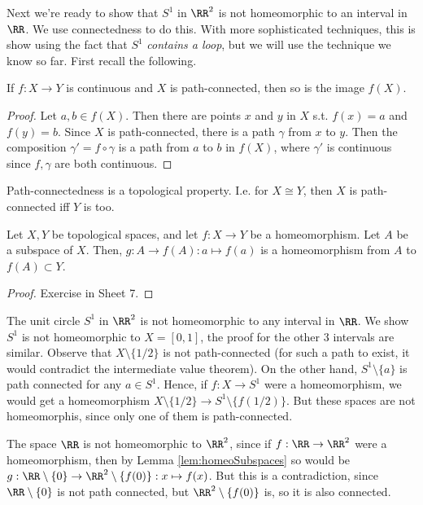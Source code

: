 Next we're ready to show that $S^{1}$ in $\RR^2$ is not homeomorphic to an
interval in $\RR$. We use connectedness to do this. With more sophisticated
techniques, this is show using the fact that $S^1$ \emph{contains a loop}, but
we will use the technique we know so far. First recall the following.
\begin{lemma}
  If $f:X\to Y$ is continuous and $X$ is path-connected, then so is the image
  $f(X)$. 
\end{lemma}
\begin{proof}
  Let $a,b\in f(X)$. Then there are points $x$ and $y$ in $X$ s.t. $f(x)=a$ and
  $f(y)=b$. Since $X$ is path-connected, there is a path $\gamma$ from $x$ to
  $y$. Then the composition $\gamma'=f\circ \gamma$ is a path from $a$ to $b$ in
  $f(X)$, where $\gamma'$ is continuous since $f,\gamma$  are both continuous.
\end{proof}
\begin{corollary}
  Path-connectedness is a topological property. I.e. for $X\cong Y$, then $X$ is
  path-connected iff $Y$ is too.
  \label{<+label+>}
\end{corollary}

\begin{lemma}
  Let $X, Y$ be topological spaces, and let $f:X\to Y$ be a homeomorphism. Let
  $A$ be a subspace of $X$. Then, $g:A\to f(A):a\mapsto f(a)$ is a homeomorphism
  from $A$ to $f(A)\subset Y$.
  \label{lem:homeoSubspaces}
\end{lemma}
\begin{proof}
  Exercise in Sheet 7.
\end{proof}

\begin{example}
   The unit circle $S^1$ in $\RR^2$ is not homeomorphic to any interval in
   $\RR$. We show $S^1$ is not homeomorphic to $X=[0,1]$, the proof for the
   other 3 intervals are similar. Observe that $X\setminus\{1/2\}$ is not
   path-connected (for such a path to exist, it would contradict the
   intermediate value theorem). On the other hand, $S^{1}\setminus\{a\}$ is path
   connected for any $a\in S^1$. Hence, if $f:X\to S^1$ were a homeomorphism, we
   would get a homeomorphism $X\setminus\{1/2\}\to S^{1}\setminus\{f(1/2)\}$.
   But these spaces are not homeomorphis, since only one of them is
   path-connected.
\end{example}

\begin{example}
  The space $\RR$ is not homeomorphic to $\RR^2$, since if $f:\RR\to\RR^2$ were
  a homeomorphism, then by Lemma \ref{lem:homeoSubspaces} so would be
  $g:\RR\setminus\{0\}\to\RR^2\setminus\{f(0)\}:x\mapsto f(x)$. But this is a
  contradiction, since $\RR\setminus\{0\}$ is not path connected, but
  $\RR^2\setminus\{f(0)\}$ is, so it is also connected. 
\end{example}


